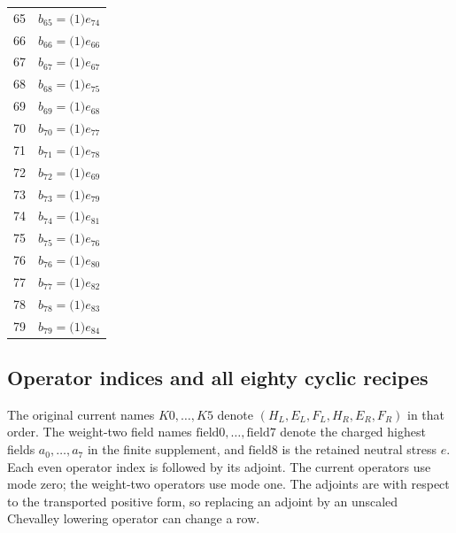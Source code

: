 \begin{longtable}{@{}rP{.82\linewidth}@{}}
65 & $b_{65}=\bigl(1\bigr)e_{74}$\\
66 & $b_{66}=\bigl(1\bigr)e_{66}$\\
67 & $b_{67}=\bigl(1\bigr)e_{67}$\\
68 & $b_{68}=\bigl(1\bigr)e_{75}$\\
69 & $b_{69}=\bigl(1\bigr)e_{68}$\\
70 & $b_{70}=\bigl(1\bigr)e_{77}$\\
71 & $b_{71}=\bigl(1\bigr)e_{78}$\\
72 & $b_{72}=\bigl(1\bigr)e_{69}$\\
73 & $b_{73}=\bigl(1\bigr)e_{79}$\\
74 & $b_{74}=\bigl(1\bigr)e_{81}$\\
75 & $b_{75}=\bigl(1\bigr)e_{76}$\\
76 & $b_{76}=\bigl(1\bigr)e_{80}$\\
77 & $b_{77}=\bigl(1\bigr)e_{82}$\\
78 & $b_{78}=\bigl(1\bigr)e_{83}$\\
79 & $b_{79}=\bigl(1\bigr)e_{84}$\\
\end{longtable}
\endgroup
\subsection{Operator indices and all eighty cyclic recipes}
The original current names $K0,\ldots,K5$ denote
$(H_L,E_L,F_L,H_R,E_R,F_R)$ in that order. The weight-two field
names $\mathrm{field}0,\ldots,\mathrm{field}7$ denote the charged
highest fields $a_0,\ldots,a_7$ in the finite supplement, and
$\mathrm{field}8$ is the retained neutral stress $e$. Each even
operator index is followed by its adjoint. The current operators use
mode zero; the weight-two operators use mode one. The adjoints are with
respect to the transported positive form, so replacing an adjoint by an
unscaled Chevalley lowering operator can change a row.

